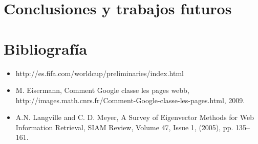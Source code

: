 \documentclass[twocolumn]{article}
\begin{document}
\section{Conclusiones y trabajos futuros}


\section{Bibliografía}
\begin{itemize}
\item http://es.fifa.com/worldcup/preliminaries/index.html
\item 
M. Eisermann, Comment Google classe les pages webb,
http://images.math.cnrs.fr/Comment-Google-classe-les-pages.html, 2009.
\item 
A.N. Langville and C. D. Meyer, A Survey of Eigenvector Methods
for Web Information Retrieval, SIAM Review, Volume 47, Issue 1,
(2005), pp. 135–161.
\end{itemize}
\end{document}
